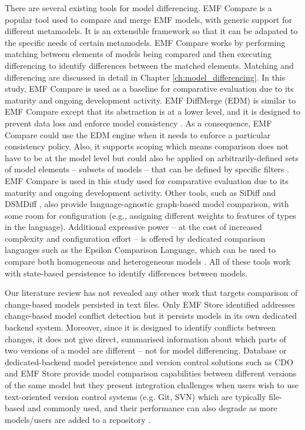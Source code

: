 There are several existing tools for model differencing. 
EMF Compare \cite{emfcompare2018developer} is a popular tool used to compare and merge EMF models, with generic support for different metamodels. It is an extensible framework so that it can be adapated to the specific needs of certain metamodels. EMF Compare works by performing matching between elements of models being compared and then executing differencing to identify differences between the matched elements. Matching and differencing are discussed in detail in Chapter \ref{ch:model_differencing}. In this study, EMF Compare is used as a baseline for comparative evaluation due to its maturity and ongoing development activity. EMF DiffMerge (EDM) \cite{eclipse2019emfdiffmerge} is similar to EMF Compare except that its abstraction is at a lower level, and it is designed to prevent data loss and enforce model consistency \cite{eclipse2019emfdiffmerge2}. As a consequence, EMF Compare could use the EDM engine when it needs to enforce a particular consistency policy. Also, it supports scoping which means comparison does not have to be at the model level but could also be applied on arbitrarily-defined sets of model elements -- subsets of models -- that can be defined by specific filters \cite{jaxenter2019emfdiffmerge}. EMF Compare is used in this study used for comparative evaluation due to its maturity and ongoing development activity. Other tools, such as SiDiff \cite{Treude2007SiDiff} and DSMDiff \cite{lin2009dsmdiff},  also provide language-agnostic graph-based model comparison, with some room for configuration (e.g., assigning different weights to features of types in the language). Additional expressive power -- at the cost of increased complexity and configuration effort -- is offered by dedicated comparison languages such as the Epsilon Comparison Language, which can be used to compare both homogeneous and heterogeneous models \cite{kolovos2009ecl}. All of these tools work with state-based persistence to identify differences between models.

Our literature review has not revealed any other work that targets comparison of change-based models persisted in text files. Only EMF Store \cite{koegel2010emfstore} identified addresses change-based model conflict detection but it persists models in its own dedicated backend system. Moreover, since it is designed to identify conflicts between changes, it does not give direct, summarised information about which parts of two versions of a model are different -- not for model differencing. Database or dedicated-backend model persistence and version control solutions such as CDO \cite{eclipse2019cdo} and EMF Store provide model comparison capabilities between different versions of the same model but they present integration challenges when users wish to use text-oriented version control systems (e.g. Git, SVN) which are typically file-based and commonly used, and their performance can also degrade as more models/users are added to a repository \cite{KolovosRMPGCLRV13}.

